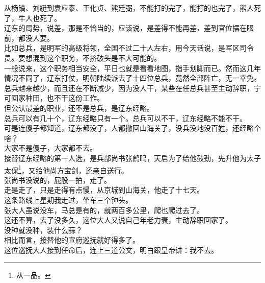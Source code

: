 \begin{multicols}{\theparacolNo}
从杨镐、刘綎到袁应泰、王化贞、熊廷弼，不能打的完了，能打的也完了，熊人死了，牛人也死了。\\

辽东的局势，说差，那是不恰当的，应该说，是差得不能再差，差到官位摆在眼前，都没人要。\\

比如总兵，是明军的高级将领，全国不过二十人左右，用今天话说，是军区司令员。要想混到这个职务，不挤破头是不大可能的。\\

一般说来，这个职务相当安全，平日也就是看看地图，指手划脚而已。然而这几年情况不同了，辽东打仗，明朝陆续派去了十四位总兵，竟然全部阵亡，无一幸免。\\

总兵越来越少，而且还在不断减少，因为没人干，某些在任总兵甚至主动辞职，宁可回家种田，也不干这份工作。\\

但公认最差的职业，还不是总兵，是辽东经略。\\

总兵可以有几十个，辽东经略只有一个。总兵可以不干，辽东经略不能不干。\\

可是连傻子都知道，辽东都没了，人都撤回山海关了，没兵没地没百姓，还经略个啥？\\

大家不是傻子，大家都不去。\\

接替辽东经略的第一人选，是兵部尚书张鹤鸣，天启为了给他鼓劲，先升他为太子太保\footnote{从一品。}，又给他尚方宝剑，还亲自送行。\\

张尚书没说的，屁股一拍，走了。\\

走是走了，只是走得有点慢，从京城到山海关，他走了十七天。\\

这条路线上星期我走过，坐车三个钟头。\\

张大人虽说没车，马总是有的，就两百多公里，爬也爬过去了。\\

这还不算，去了没多久，这位大人又说自己年老力衰，主动辞职回家了。\\

没种就没种，装什么蒜？\\

相比而言，接替他的宣府巡抚就好得多了。\\

这位巡抚大人接到任命后，连上三道公文，明白跟皇帝讲：我不去。\\


\end{multicols}
